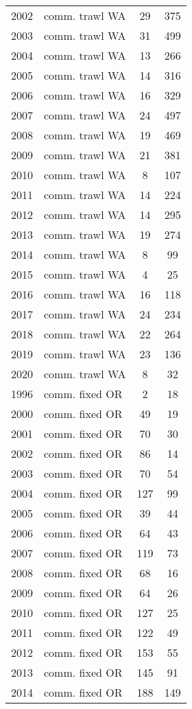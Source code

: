 \begin{longtable}[t]{c>{\centering\arraybackslash}p{4cm}cc}
2002 & comm. trawl WA & 29 & 375\\
2003 & comm. trawl WA & 31 & 499\\
2004 & comm. trawl WA & 13 & 266\\
2005 & comm. trawl WA & 14 & 316\\
2006 & comm. trawl WA & 16 & 329\\
2007 & comm. trawl WA & 24 & 497\\
2008 & comm. trawl WA & 19 & 469\\
2009 & comm. trawl WA & 21 & 381\\
2010 & comm. trawl WA & 8 & 107\\
2011 & comm. trawl WA & 14 & 224\\
2012 & comm. trawl WA & 14 & 295\\
2013 & comm. trawl WA & 19 & 274\\
2014 & comm. trawl WA & 8 & 99\\
2015 & comm. trawl WA & 4 & 25\\
2016 & comm. trawl WA & 16 & 118\\
2017 & comm. trawl WA & 24 & 234\\
2018 & comm. trawl WA & 22 & 264\\
2019 & comm. trawl WA & 23 & 136\\
2020 & comm. trawl WA & 8 & 32\\
1996 & comm. fixed OR & 2 & 18\\
2000 & comm. fixed OR & 49 & 19\\
2001 & comm. fixed OR & 70 & 30\\
2002 & comm. fixed OR & 86 & 14\\
2003 & comm. fixed OR & 70 & 54\\
2004 & comm. fixed OR & 127 & 99\\
2005 & comm. fixed OR & 39 & 44\\
2006 & comm. fixed OR & 64 & 43\\
2007 & comm. fixed OR & 119 & 73\\
2008 & comm. fixed OR & 68 & 16\\
2009 & comm. fixed OR & 64 & 26\\
2010 & comm. fixed OR & 127 & 25\\
2011 & comm. fixed OR & 122 & 49\\
2012 & comm. fixed OR & 153 & 55\\
2013 & comm. fixed OR & 145 & 91\\
2014 & comm. fixed OR & 188 & 149\\

\end{longtable}
